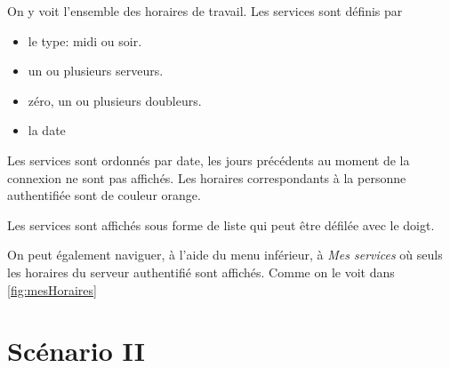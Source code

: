 On y voit l'ensemble des horaires de travail. Les services sont définis par
\begin{itemize}
    \item le type: midi ou soir.
    \item un ou plusieurs serveurs.
    \item zéro, un ou plusieurs doubleurs.
    \item la date
\end{itemize}
Les services sont ordonnés par date, les jours précédents au moment de la connexion ne 
sont pas affichés. Les horaires correspondants à la personne authentifiée sont de couleur orange.

Les services sont affichés sous forme de liste qui peut être défilée avec le doigt.

On peut également naviguer, à l'aide du menu inférieur, à \textit{Mes services} où seuls les horaires du serveur authentifié sont affichés. Comme on le voit 
dans \ref{fig:mesHoraires}

\section[Mise en bourse d'un service - Scénario II]{Scénario II}
